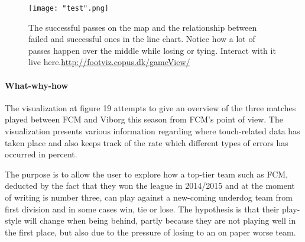 \documentclass[Report.tex]{subfiles}
\begin{document}
 

\begin{figure}
	\center
	\texttt{[image: "test".png]}
	\caption{The successful passes on the map and the relationship between failed and successful ones in the line chart. Notice how a lot of passes happen over the middle while losing or tying. Interact with it live here.\url{http://footviz.copus.dk/gameView/}}
	\label{Fig:}
\end{figure}


\paragraph{What-why-how \\}
The visualization at figure 19 attempts to give an overview of the three matches played between FCM and Viborg this season from FCM's point of view. The visualization presents various information regarding where touch-related data has taken place and also keeps track of the rate which different types of errors has occurred in percent.

The purpose is to allow the user to explore how a top-tier team such as FCM, deducted by the fact that they won the league in 2014/2015 and at the moment of writing is number three, can play against a new-coming underdog team from first division and in some cases win,  tie or lose. The hypothesis is that their play-style will change when being behind, partly because they are not playing well in the first place, but also due to the pressure of losing to an on paper worse team.\\
\end{document}
